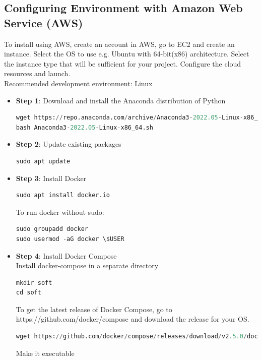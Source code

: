 \documentclass[letterpaper,12pt,notitlepage,twoside]{report}
\begin{document}
\subsection{Configuring Environment with Amazon Web Service (AWS)}
To install using AWS,  create an account in AWS, go to EC2 and create an instance. Select the OS to use e.g. Ubuntu with 64-bit(x86) architecture. Select the instance type that will be sufficient for your project. Configure the cloud resources and launch. \\
Recommended development environment: Linux

 \begin{itemize}
\item \textbf{Step 1}: Download and install the Anaconda distribution of Python 
\begin{lstlisting}[language=python, numbers=none]
wget https://repo.anaconda.com/archive/Anaconda3-2022.05-Linux-x86_64.sh
bash Anaconda3-2022.05-Linux-x86_64.sh
\end{lstlisting}
\item \textbf{Step 2}: Update existing packages
\begin{lstlisting}[language=python, numbers=none]
sudo apt update
\end{lstlisting}
\item \textbf{Step 3}: Install Docker
\begin{lstlisting}[language=python, numbers=none]
sudo apt install docker.io
\end{lstlisting}
To run docker without sudo:
\begin{lstlisting}[language=python, numbers=none]
sudo groupadd docker
sudo usermod -aG docker \$USER
\end{lstlisting}
\item \textbf{Step 4}: Install Docker Compose \\
Install docker-compose in a separate directory
\begin{lstlisting}[language=python, numbers=none]
mkdir soft
cd soft
\end{lstlisting}
To get the latest release of Docker Compose, go to https://github.com/docker/compose and download the release for your OS.
\begin{lstlisting}[language=python, numbers=none]
wget https://github.com/docker/compose/releases/download/v2.5.0/docker-compose-linux-x86_64 -O docker-compose
\end{lstlisting}
Make it executable
\begin{lstlisting}[language=python, numbers=none]

\end{lstlisting}
\end{itemize}
\end{document}
